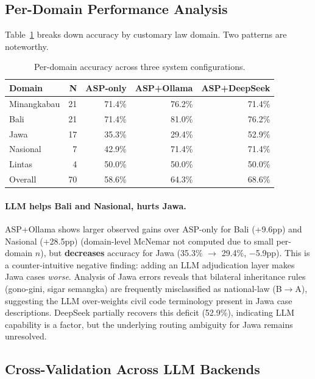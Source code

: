 \documentclass[11pt]{article}
\begin{document}
\subsection{Per-Domain Performance Analysis}

Table~\ref{tab:domain} breaks down accuracy by customary law domain. Two patterns are noteworthy.

\begin{table}[h]
\centering
\begin{tabular}{lrrrr}
\toprule
Domain & N & ASP-only & ASP+Ollama & ASP+DeepSeek \\
\midrule
Minangkabau & 21 & 71.4\% & 76.2\% & 71.4\% \\
Bali        & 21 & 71.4\% & 81.0\% & 76.2\% \\
Jawa        & 17 & 35.3\% & 29.4\% & 52.9\% \\
Nasional    &  7 & 42.9\% & 71.4\% & 71.4\% \\
Lintas      &  4 & 50.0\% & 50.0\% & 50.0\% \\
\midrule
Overall     & 70 & 58.6\% & 64.3\% & 68.6\% \\
\bottomrule
\end{tabular}
\caption{Per-domain accuracy across three system configurations.}
\label{tab:domain}
\end{table}

\paragraph{LLM helps Bali and Nasional, hurts Jawa.}
ASP+Ollama shows larger observed gains over ASP-only for Bali (+9.6pp) and Nasional (+28.5pp) (domain-level McNemar not computed due to small per-domain $n$), but \textbf{decreases} accuracy for Jawa (35.3\% $\rightarrow$ 29.4\%, $-$5.9pp). This is a counter-intuitive negative finding: adding an LLM adjudication layer makes Jawa cases \textit{worse}. Analysis of Jawa errors reveals that bilateral inheritance rules (gono-gini, sigar semangka) are frequently misclassified as national-law (B$\rightarrow$A), suggesting the LLM over-weights civil code terminology present in Jawa case descriptions. DeepSeek partially recovers this deficit (52.9\%), indicating LLM capability is a factor, but the underlying routing ambiguity for Jawa remains unresolved.

\subsection{Cross-Validation Across LLM Backends}
\label{sec:crossval}
\end{document}
